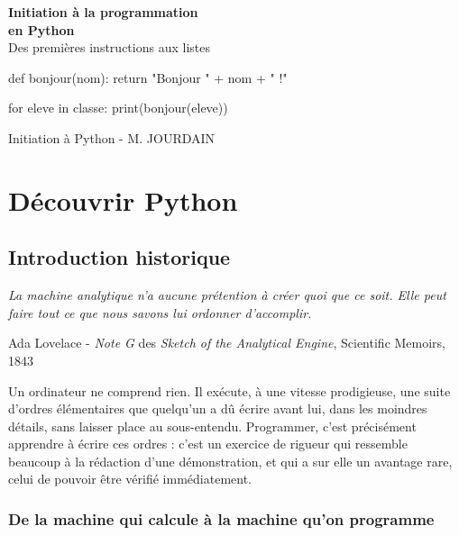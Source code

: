 \documentclass[a4paper,11pt,openany]{book}
\newcommand{\lauteur}{Initiation à Python - M. JOURDAIN}
\newcommand{\epigraphe}[2]{%
  \begin{list}{}{\leftmargin=1cm \rightmargin=1cm}\item[]
  \small\textit{#1}
  \end{list}
  \nopagebreak
  \hfill\small #2 \par\vspace{4mm}}
\begin{document}
\begin{titlepage}
\begin{center}
\vspace*{3cm}
{\Huge \textbf{Initiation à la programmation}}\\[6mm]
{\Huge \textbf{en \textcolor{rougecours}{Python}}}\\[1.5cm]
{\Large Des premières instructions aux listes}\\[2.5cm]

\begin{minipage}{10.5cm}
\begin{python}
def bonjour(nom):
    return "Bonjour " + nom + " !"

for eleve in classe:
    print(bonjour(eleve))
\end{python}
\end{minipage}

\vfill
{\large \lauteur}\\[3mm]
\end{center}
\end{titlepage}

\tableofcontents
\thispagestyle{empty}
\chapter{Découvrir Python}

\section{Introduction historique}

\epigraphe{La machine analytique n'a aucune prétention à créer quoi que ce soit. Elle peut faire tout ce que nous savons lui ordonner d'accomplir.}{Ada Lovelace - \emph{Note G} des \emph{Sketch of the Analytical Engine}, Scientific Memoirs, 1843}

Un ordinateur ne comprend rien. Il exécute, à une vitesse prodigieuse, une suite d'ordres élémentaires que quelqu'un a dû écrire avant lui, dans les moindres détails, sans laisser place au sous-entendu. Programmer, c'est précisément apprendre à écrire ces ordres : c'est un exercice de rigueur qui ressemble beaucoup à la rédaction d'une démonstration, et qui a sur elle un avantage rare, celui de pouvoir être vérifié immédiatement.

\subsection{De la machine qui calcule à la machine qu'on programme}
\end{document}
